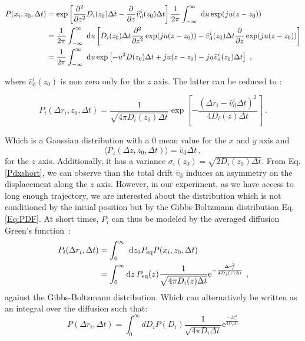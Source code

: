 \begin{equation}
	\begin{aligned}
	P(x_i, z_0, \Delta t) &= \exp \left[  \frac{\partial ^2}{\partial z ^2} D_i(z_0) \Delta t - \frac{\partial}{\partial z} \bar{v}^i _\mathrm{d} (z_0) \Delta t \right] \frac{1}{2 \pi} \int _{-\infty} ^{\infty} ~ \textnormal{d}u \exp (ju(z-z_0))  \\
	&= \frac{1}{2\pi} \int _{-\infty} ^{\infty} ~ \textnormal{d}u  \left[ D_i(z_0) \Delta t \frac{\partial ^2}{\partial z ^2} \exp (ju(z-z_0)) -  \bar{v}^i _\mathrm{d} (z_0) \Delta t \frac{\partial}{\partial z} \exp (ju(z-z_0)) \right] \\
	& = \frac{1}{2\pi} \int_{-\infty}^{\infty} ~ \textnormal{d}u \exp \left[ -u^2 D(z_0)\Delta t + ju(z-z_0) - ju  \bar{v}^i _\mathrm{d} (z_0) \Delta t \right] ~,
	\end{aligned}
\end{equation}

where $ \bar{v}^i _\mathrm{d} (z_0)$ is non zero only for the $z$ axis. The latter can be reduced to \cite{matse_state-dependent_nodate, risken_fokker-planck_2012}:

\begin{equation}
	P_i(\Delta r_i, z_0, \Delta t) =   \frac{1}{\sqrt{4 \pi D_i(z_0) \Delta t}} \exp \left[-\frac{(\Delta r_i - \bar{v}^i_\mathrm{d}\Delta t)^2}{4 D_i(z) \Delta t}   \right]\ .
	\label{Pdxshort}
\end{equation}

Which is a Gaussian distribution with a 0 mean value for the $x$ and $y$ axis and  
\begin{equation}
\langle P_z(\Delta z, z_0, \Delta t) \rangle = \bar{v}_\mathrm{d} \Delta t	~,
\end{equation}
for the $z$ axis. Additionally, it has a variance $\sigma_i(z_0) = \sqrt{2D_i (z_0) \Delta t}$. From Eq.\ref{Pdxshort}, we can observe than the total drift $\bar{v}_\mathrm{d}$ induces an asymmetry on the displacement along the $z$ axis. However, in our experiment, as we have access to long enough trajectory, we are interested about the distribution which is not conditioned by the initial position but by the Gibbs-Boltzmann distribution Eq.\ref{Eq:PDF}. At short times, $P_i$ can thus be modeled by the averaged diffusion Green's function~\cite{matse_test_2017,hapca_anomalous_2009}:
\begin{equation}
	\begin{aligned}
		P_i(\Delta r_i, \Delta t) & = \int _{0} ^\infty ~\textnormal{d} z_0 P_\mathrm{eq}  P(x_i, z_0, \Delta t) \\
		&= \int ^\infty _0 \mathrm{d}z\, P_{\textrm{eq}}(z) \frac{1}{\sqrt{4 \pi D_i(z) \Delta t}} \textrm{e}^{-\frac{\Delta r_i^2}{4 D_i(z) \Delta t}     }\ ,
	\end{aligned}
	\label{Eq:PDzshort}
\end{equation}
against the Gibbs-Boltzmann distribution. Which can alternatively be written as an integral over the diffusion such that:
\begin{equation}
	P(\Delta r_i , \Delta t) = \int_0 ^\infty dD_iP(D_i) \frac{1}{\sqrt{4 \pi D_i \Delta t}} \mathrm{e} ^{\frac{-\Delta r_i ^2}{4D_i\Delta t}} 
\end{equation}

